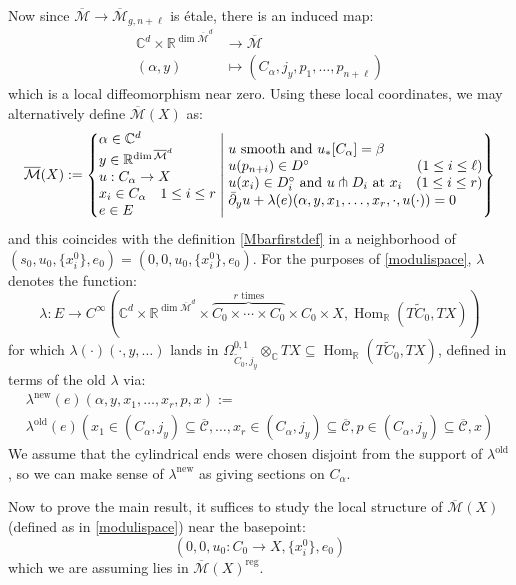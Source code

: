 \documentclass[12pt]{article}
\theoremstyle{definition}
\theoremstyle{remark}
\numberwithin{equation}{subsection}
\newcommand{\CC}{\mathbb C}
\newcommand{\RR}{\mathbb R}
\newcommand{\Mbar}{\overline{\mathcal M}}
\newcommand{\Cbar}{\overline{\mathcal C}}
\newcommand{\delbar}{\bar\partial}
\newcommand{\Hom}{\operatorname{Hom}}
\newcommand{\reg}{\mathrm{reg}}
\begin{document}
Now since $\Mbar\to\Mbar_{g,n+\ell}$ is \'etale, there is an induced map:
\begin{align}
\CC^d\times\RR^{\dim\Mbar^d}&\to\Mbar\\
(\alpha,y)&\mapsto(C_\alpha,j_y,p_1,\ldots,p_{n+\ell})
\end{align}
which is a local diffeomorphism near zero.  Using these local coordinates, we may alternatively define $\Mbar(X)$ as:
\begin{equation}\label{modulispace}
\Mbar(X):=\left\{\begin{matrix}\alpha\in\CC^d\hfill\cr y\in\RR^{\dim\Mbar^d}\hfill\cr u:C_\alpha\to X\hfill\cr x_i\in C_\alpha\quad 1\leq i\leq r\hfill\cr e\in E\hfill\end{matrix}\;\middle|\;\begin{matrix}u\text{ smooth and }u_\ast[C_\alpha]=\beta\hfill\cr u(p_{n+i})\in D^\circ\quad\hfill(1\leq i\leq\ell)\cr u(x_i)\in D_i^\circ\text{ and }u\pitchfork D_i\text{ at }x_i\quad\hfill(1\leq i\leq r)\cr\delbar_yu+\lambda(e)(\alpha,y,x_1,\ldots,x_r,\cdot,u(\cdot))=0\hfill\end{matrix}\right\}
\end{equation}
and this coincides with the definition \eqref{Mbarfirstdef} in a neighborhood of $(s_0,u_0,\{x_i^0\},e_0)=(0,0,u_0,\{x_i^0\},e_0)$.  For the purposes of \eqref{modulispace}, $\lambda$ denotes the function:
\begin{equation*}%
\lambda:E\to C^\infty(\CC^d\times\RR^{\dim\Mbar^d}\times\overbrace{C_0\times\cdots\times C_0}^{r\text{ times}}{}\times C_0\times X,\Hom_\RR(T\tilde C_0,TX))
\end{equation*}
for which $\lambda(\cdot)(\cdot,y,\ldots)$ lands in $\Omega^{0,1}_{\tilde C_0,j_y}\otimes_\CC TX\subseteq\Hom_\RR(T\tilde C_0,TX)$, defined in terms of the old $\lambda$ via:
\begin{multline*}%
\lambda^\mathrm{new}(e)(\alpha,y,x_1,\ldots,x_r,p,x):=\\
\lambda^\mathrm{old}(e)(x_1\in(C_\alpha,j_y)\subseteq\Cbar,\ldots,x_r\in (C_\alpha,j_y)\subseteq\Cbar,p\in(C_\alpha,j_y)\subseteq\Cbar,x)
\end{multline*}
We assume that the cylindrical ends were chosen disjoint from the support of $\lambda^\mathrm{old}$, so we can make sense of $\lambda^\mathrm{new}$ as giving sections on $C_\alpha$.

Now to prove the main result, it suffices to study the local structure of $\Mbar(X)$ (defined as in \eqref{modulispace}) near the basepoint:
\begin{equation}
(0,0,u_0:C_0\to X,\{x_i^0\},e_0)
\end{equation}
which we are assuming lies in $\Mbar(X)^\reg$.
\end{document}
